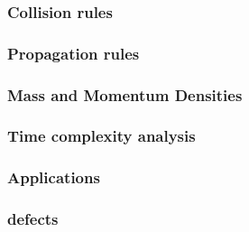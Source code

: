 \documentclass[a4paper,10pt]{article}
\begin{document}
\subsubsection{Collision rules}
\subsubsection{Propagation rules}
\subsubsection{Mass and Momentum Densities}
\subsubsection{Time complexity analysis}
\subsubsection{Applications}
\subsubsection{defects}
\end{document}
